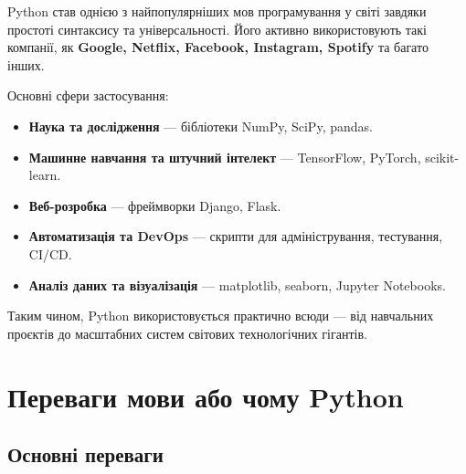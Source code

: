 Python став однією з найпопулярніших мов програмування у світі завдяки простоті синтаксису та універсальності. Його активно використовують такі компанії, як \textbf{Google, Netflix, Facebook, Instagram, Spotify} та багато інших.

\medskip
Основні сфери застосування:
\begin{itemize}
	\item \textbf{Наука та дослідження} --- бібліотеки NumPy, SciPy, pandas.
	\item \textbf{Машинне навчання та штучний інтелект} --- TensorFlow, PyTorch, scikit-learn.
	\item \textbf{Веб-розробка} --- фреймворки Django, Flask.
	\item \textbf{Автоматизація та DevOps} --- скрипти для адміністрування, тестування, CI/CD.
	\item \textbf{Аналіз даних та візуалізація} --- matplotlib, seaborn, Jupyter Notebooks.
\end{itemize}

\medskip
Таким чином, Python використовується практично всюди --- від навчальних проєктів до масштабних систем світових технологічних гігантів.



\section{Переваги мови або чому Python}

\subsection*{Основні переваги}

